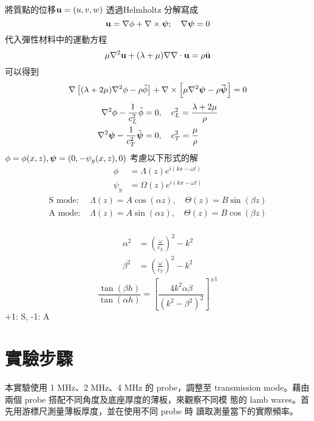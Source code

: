 \documentclass[10pt]{report}
\begin{document}
將質點的位移$\boldsymbol{\mathbf{u}}=(u,v,w)$ 透過Helmholtz 分解寫成
\begin{equation}
    \boldsymbol{\mathbf{u}}=\nabla\phi+\nabla\times\boldsymbol{\mathbf{\psi}};\quad \nabla\boldsymbol{\mathbf{\psi}}=0
\end{equation}
代入彈性材料中的運動方程
\begin{equation}
    \mu \nabla^2 \boldsymbol{\mathbf{u}} + (\lambda+\mu)\nabla\nabla\cdot \boldsymbol{\mathbf{u}}=\rho \ddot{\boldsymbol{\mathbf{u}}}
\end{equation}
可以得到
\begin{equation}
    \nabla\left[(\lambda+2\mu)\nabla^2\phi-\rho\ddot{\phi}\right]
    +\nabla\times\left[\mu\nabla^2\boldsymbol{\mathbf{\psi}}-\rho\boldsymbol{\mathbf{\ddot{\boldsymbol{\mathbf{\psi}}}}}\right]=0
\end{equation}
\begin{align}
    \nabla^2\phi-\frac{1}{c_L^2}\ddot{\phi}&=0,\quad c_L^2=\frac{\lambda+2\mu}{\rho} \\
    \nabla^2\boldsymbol{\mathbf{\psi}}-\frac{1}{c_T^2}\ddot{\boldsymbol{\mathbf{\psi}}}&=0,\quad c_T^2=\frac{\mu}{\rho}
\end{align}
$\phi=\phi(x,z), \boldsymbol{\mathbf{\psi}}=(0,-\psi_y(x,z),0)$
考慮以下形式的解
\begin{align}
    \phi&=\Lambda(z)e^{i(kx-\omega t)} \\
    \psi_y&=\Omega(z)e^{i(kx-\omega t)}
\end{align}
\begin{align}
    \text{S mode: } & \Lambda(z)=A\cos(\alpha z),\quad \Theta(z)=B\sin(\beta z) \\
    \text{A mode: } & \Lambda(z)=A\sin(\alpha z),\quad \Theta(z)=B\cos(\beta z) \\
\end{align}

\begin{align}
    \alpha^2&=\left(\frac{\omega}{c_L}\right)^2-k^2 \\
    \beta^2&=\left(\frac{\omega}{c_T}\right)^2-k^2 
\end{align}
\begin{equation}
    \frac{\tan(\beta h)}{\tan(\alpha h)}=\left[ 
    \frac{4k^2\alpha\beta}{(k^2-\beta^2)^2}
    \right]^{\pm 1}
\end{equation}
+1: S, -1: A
\section{實驗步驟}

本實驗使用 1 MHz、2 MHz、4 MHz 的 probe，調整至 transmission 
mode。藉由兩個 probe 搭配不同角度及底座厚度的薄板，來觀察不同模
態的 lamb waves。首先用游標尺測量薄板厚度，並在使用不同 probe 時
讀取測量當下的實際頻率。
\end{document}
